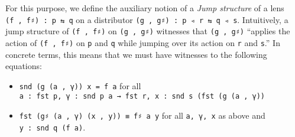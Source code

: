 \documentclass[
  11pt,
  oneside,
  article]{memoir}
\providecommand{\tightlist}{%
  \setlength{\itemsep}{0pt}\setlength{\parskip}{0pt}}
\theoremstyle{definition}
\theoremstyle{plain}
\newcommand{\0}{\textsf{0}}
\newcommand{\1}{\tn{\textsf{1}}}
\begin{document}
For this purpose, we define the auxiliary notion of a \emph{Jump
structure} of a lens \texttt{(f\ ,\ f♯)\ :\ p\ ⇆\ q} on a distributor
\texttt{(g\ ,\ g♯)\ :\ p\ ◃\ r\ ⇆\ q\ ◃\ s}. Intuitively, a jump
structure of \texttt{(f\ ,\ f♯)} on \texttt{(g\ ,\ g♯)} witnesses that
\texttt{(g\ ,\ g♯)} ``applies the action of \texttt{(f\ ,\ f♯)} on
\texttt{p} and \texttt{q} while jumping over its action on \texttt{r}
and \texttt{s}.'' In concrete terms, this means that we must have
witnesses to the following equations:

\begin{itemize}
\tightlist
\item
  \texttt{snd\ (g\ (a\ ,\ γ))\ x\ =\ f\ a} for all
  \texttt{a\ :\ fst\ p,\ γ\ :\ snd\ p\ a\ →\ fst\ r,\ x\ :\ snd\ s\ (fst\ (g\ (a\ ,\ γ))}
\item
  \texttt{fst\ (g♯\ (a\ ,\ γ)\ (x\ ,\ y))\ ≡\ f♯\ a\ y} for all
  \texttt{a,\ γ,\ x} as above and \texttt{y\ :\ snd\ q\ (f\ a)}.
\end{itemize}
\end{document}
